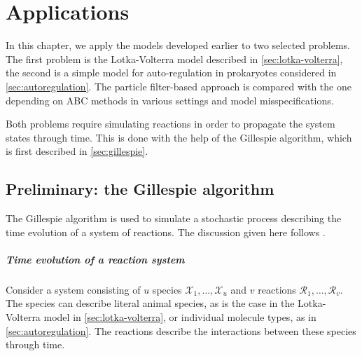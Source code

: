 \chapter{Applications}
\label{chap:applications}

In this chapter, we apply the models developed earlier to two selected problems. The first problem is the Lotka-Volterra model described in \autoref{sec:lotka-volterra}, the second is a simple model for auto-regulation in prokaryotes considered in \autoref{sec:autoregulation}. The particle filter-based approach is compared with the one depending on ABC methods in various settings and model misspecifications.

Both problems require simulating reactions in order to propagate the system states through time. This is done with the help of the Gillespie algorithm, which is first described in \autoref{sec:gillespie}.

\section{Preliminary: the Gillespie algorithm} \label{sec:gillespie}
The Gillespie algorithm \citep{gillespie1, gillespie2} is used to simulate a stochastic process describing the time evolution of a system of reactions. The discussion given here follows \cite{wilkinson-book}.

\paragraph{Time evolution of a reaction system}
Consider a system consisting of $u$ species $\mathcal{X}_1, \ldots, \mathcal{X}_u$ and $v$ reactions $\mathcal{R}_1, \ldots, \mathcal{R}_v$. The species can describe literal animal species, as is the case in the Lotka-Volterra model in \autoref{sec:lotka-volterra}, or individual molecule types, as in \autoref{sec:autoregulation}. The reactions describe the interactions between these species through time.

